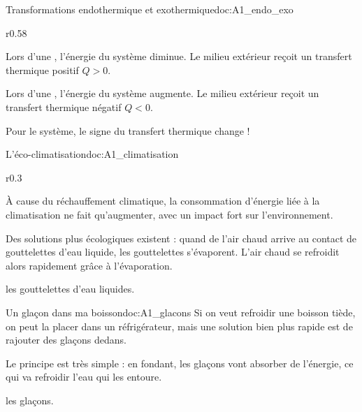 \begin{doc}{Transformations endothermique et exothermique}{doc:A1_endo_exo}
  \begin{wrapfigure}{r}{0.58\linewidth}
  \end{wrapfigure}
  \phantom{b}\vspace*{-20pt}
  
  \begin{importants}
    \pointCyan Lors d'une , l'énergie du système diminue. 
    Le milieu extérieur reçoit un transfert thermique positif $Q > 0$.
    \bigskip
    
    \pointCyan Lors d'une , l'énergie du système augmente.
    Le milieu extérieur reçoit un transfert thermique négatif $Q < 0$.
  \end{importants}

  \attention Pour le système, le signe du transfert thermique change !
\end{doc}


\begin{doc}{L'éco-climatisation}{doc:A1_climatisation}
  \begin{wrapfigure}{r}{0.3\linewidth}
    \vspace*{-34pt}
    \centering
  \end{wrapfigure}
  À cause du réchauffement climatique, la consommation d'énergie liée à la climatisation ne fait qu'augmenter, avec un impact fort sur l'environnement.
  
  Des solutions plus écologiques existent : quand de l'air chaud arrive au contact de gouttelettes d'eau liquide, les gouttelettes s'évaporent.
  L'air chaud se refroidit alors rapidement grâce à l'évaporation.

   les gouttelettes d'eau liquides.
\end{doc}

\begin{doc}{Un glaçon dans ma boisson}{doc:A1_glacons}
  Si on veut refroidir une boisson tiède, on peut la placer dans un réfrigérateur, mais une solution bien plus rapide est de rajouter des glaçons dedans.
  
  Le principe est très simple : en fondant, les glaçons vont absorber de l'énergie, ce qui va refroidir l'eau qui les entoure.

   les glaçons.
\end{doc}

